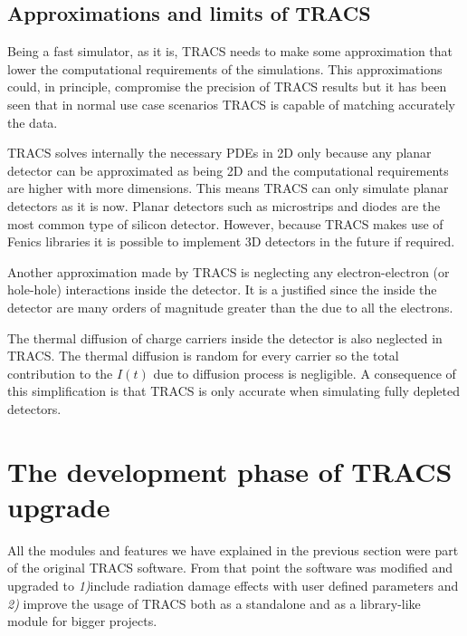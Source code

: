 \subsection{Approximations and limits of TRACS} %
\label{sec:approxTRACS}

Being a fast simulator, as it is, TRACS needs to make some approximation that lower the computational requirements of the simulations. This approximations could, in principle, compromise the precision of TRACS results but it has been seen that in normal use case scenarios TRACS is capable of matching accurately the data\cite{TRACSCompar}.
 
TRACS solves internally the necessary PDEs in 2D only because any planar detector can be approximated as being 2D and the computational requirements are higher with more dimensions. This means TRACS can only simulate planar detectors as it is now. Planar detectors such as microstrips and diodes are the most common type of silicon detector. However, because TRACS makes use of Fenics libraries it is possible to implement 3D detectors in the future if required.

Another approximation made by TRACS is neglecting any electron-electron (or hole-hole) interactions inside the detector. It is a justified since the  inside the detector are many orders of magnitude greater than the  due to all the electrons. 

The thermal diffusion of charge carriers inside the detector is also neglected in TRACS. The thermal diffusion is random for every carrier so the total contribution to the $I(t)$ due to diffusion process is negligible. A consequence of this simplification is that TRACS is only accurate when simulating fully depleted detectors. 

\section{The development phase of TRACS upgrade} %
\label{sec:werk}

All the modules and features we have explained in the previous section were part of the original TRACS software. From that point the software was modified and upgraded to \emph{1)}include radiation damage effects  with user defined parameters and \emph{2)} improve the usage of TRACS both as a standalone and as a library-like module for bigger projects.


